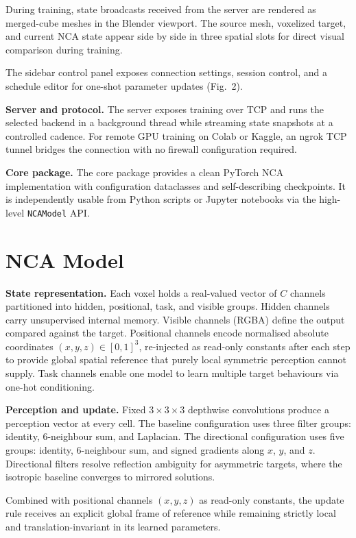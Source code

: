 \documentclass{ExcelAtFIT}
\begin{document}
During training, state broadcasts received from the server are rendered as
merged-cube meshes in the Blender viewport. The source mesh, voxelized target, and
current NCA state appear side by side in three spatial slots for direct visual
comparison during training.

The sidebar control panel exposes connection settings, session control, and a schedule editor for
one-shot parameter updates (Fig.~2).

\textbf{Server and protocol.}
The server exposes training over TCP and runs the selected backend in a background thread while
streaming state snapshots at a controlled cadence. For remote GPU training on Colab or Kaggle, an ngrok
TCP tunnel bridges the connection with no firewall configuration required.

\textbf{Core package.}
The core package provides a clean PyTorch NCA implementation with configuration dataclasses and
self-describing checkpoints. It is independently usable from Python scripts or Jupyter notebooks via the
high-level \texttt{NCAModel} API.

\section{NCA Model}

\textbf{State representation.}
Each voxel holds a real-valued vector of $C$ channels partitioned into hidden,
positional, task, and visible groups. Hidden channels carry unsupervised internal
memory. Visible channels (RGBA) define the output compared against the target.
Positional channels encode normalised absolute coordinates
$(x,y,z) \in [0,1]^3$, re-injected as read-only constants after each step to
provide global spatial reference that purely local symmetric perception cannot
supply. Task channels enable one model to learn multiple target behaviours via
one-hot conditioning.

\textbf{Perception and update.}
Fixed $3\times3\times3$ depthwise convolutions produce a perception vector at every
cell. The baseline configuration uses three filter groups: identity, 6-neighbour
sum, and Laplacian. The directional configuration uses five groups: identity,
6-neighbour sum, and signed gradients along $x$, $y$, and $z$. Directional filters
resolve reflection ambiguity for asymmetric targets, where the isotropic baseline
converges to mirrored solutions.

Combined with positional channels $(x,y,z)$ as read-only constants, the update rule receives an explicit global
frame of reference while remaining strictly local and translation-invariant in its learned parameters.
\end{document}
